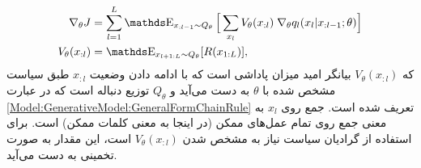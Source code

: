 \begin{equation}\label{Ch2:Equation:Reinforcment:PolicyGradient}
\begin{split}
\nabla_\theta J &=   \sum_{l=1}^L   \ME_{x_{:l-1} \sim Q_\theta} \Big[ \sum_{x_l} V_\theta(x_{:l}) \; \nabla_\theta q_l(x_l | x_{:l-1}; \theta)  \Big] \\
V_\theta(x_{:l}) &= \ME_{x_{l+1:L} \sim Q_\theta} [R(x_{1:L})],
\end{split}
\end{equation}
که 
$V_\theta(x_{:l})$
بیانگر امید میزان پاداشی است که با ادامه دادن وضعیت
$x_{:l}$
طبق سیاست مشخص شده با
$\theta$
به دست می‌آید و 
$Q_\theta$
توزیع دنباله است که در عبارت
\ref{Model:GenerativeModel:GeneralFormChainRule}
تعریف شده است.
 جمع روی
$x_l$
به معنی جمع روی تمام عمل‌های ممکن (در اینجا به معنی کلمات ممکن) است.
\newline
برای استفاده از گرادیان سیاست نیاز به مشخص شدن
$V_\theta(x_{:l})$
است، این مقدار به صورت تخمینی به دست می‌آید. 

